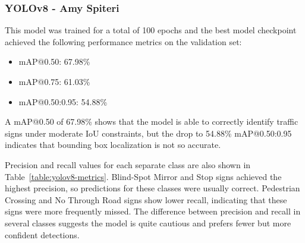 \documentclass{article}
\begin{document}



\subsubsection*{YOLOv8 - Amy Spiteri}

This model was trained for a total of 100 epochs and the best model checkpoint achieved the following performance metrics on the validation set:

\begin{itemize}
    \item mAP@0.50: 67.98\%
    \item mAP@0.75: 61.03\%
    \item mAP@0.50:0.95: 54.88\%
\end{itemize}

A mAP@0.50 of 67.98\% shows that the model is able to correctly identify traffic signs under moderate IoU constraints, but the drop to 54.88\% mAP@0.50:0.95 indicates that bounding box localization is not so accurate.

Precision and recall values for each separate class are also shown in Table~\ref{table:yolov8-metrics}. Blind-Spot Mirror and Stop signs achieved the highest precision, so predictions for these classes were usually correct. Pedestrian Crossing and No Through Road signs show lower recall, indicating that these signs were more frequently missed. The difference between precision and recall in several classes suggests the model is quite cautious and prefers fewer but more confident detections.
\end{document}
